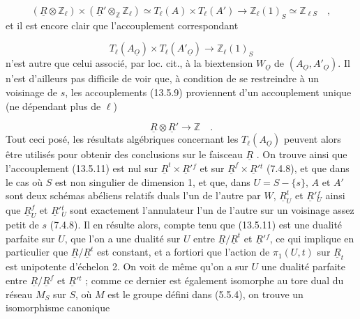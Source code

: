 
\begin{equation}\tag{13.5.9}
(\underline{R}\otimes\mathbb{Z}_\ell) \times (\underline{R}'\otimes_{\mathbb{Z}}\mathbb{Z}_\ell) \simeq T_\ell(A) \times T_\ell(A') \to \mathbb{Z}_\ell(1)_S \simeq \mathbb{Z}_{\ell S} \quad ,
\end{equation}
et il est encore clair que l'accouplement correspondant

\begin{equation}\tag{13.5.10}
T_\ell(A_{\underline{O}}) \times T_\ell(A'_{\underline{O}}) \longrightarrow \mathbb{Z}_\ell(1)_S
\end{equation}
n'est autre que celui associé, par loc. cit., à la biextension $W_{\underline{O}}$ de $(A_{\underline{O}},A'_{\underline{O}})$. Il n'est d'ailleurs pas difficile de voir que, à condition de se restreindre à un voisinage de $s$, les accouplements (13.5.9) proviennent d'un accouplement unique (ne dépendant plus de $\ell$)

\begin{equation}\tag{13.5.11}
\underline{R} \otimes \underline{R}' \longrightarrow \mathbb{Z} \quad .
\end{equation}
Tout ceci posé, les résultats algébriques concernant les $T_\ell(A_{\underline{O}})$ peuvent alors être utilisés pour obtenir des conclusions sur le faisceau $\underline{R}$ . On trouve ainsi que l'accouplement (13.5.11) est nul sur $\underline{R}^{t} \times \underline{R}'{}^{f}$ et sur $\underline{R}^{f} \times \underline{R}'{}^{t}$ (7.4.8), et que dans le cas où $S$ est non singulier de dimension 1, et que, dans $U = S-\{s\}$, $A$ et $A'$ sont deux schémas abéliens relatifs duals l'un de l'autre par $W$, $\underline{R}^{t}_{U}$ et $\underline{R}'{}^{f}_{U}$ ainsi que $\underline{R}^{f}_{U}$ et $\underline{R}'{}^{t}_{U}$ sont exactement l'annulateur l'un de l'autre sur un voisinage assez petit de $s$ (7.4.8). Il en résulte alors, compte tenu que (13.5.11) est une dualité parfaite sur $U$, que l'on a une dualité sur $U$ entre $\underline{R}/\underline{R}^{t}$ et $\underline{R}'{}^{f}$, ce qui implique en particulier que $\underline{R}/\underline{R}^{t}$ est constant, et a fortiori que l'action de $\pi_1(U,t)$ sur $\underline{R}_t$ est unipotente d'échelon 2. On voit de même qu'on a sur $U$ une dualité parfaite entre $\underline{R}/\underline{R}^{f}$ et $\underline{R}'{}^{t}$ ; comme ce dernier est également isomorphe au tore dual du réseau $M_S$ sur $S$, où $M$ est le groupe défini dans (5.5.4), on trouve un isomorphisme canonique


